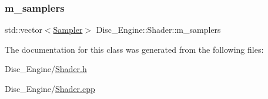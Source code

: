 \mbox{\label{class_disc___engine_1_1_shader_a63a34fc1f35b70acfcf2d8113d2bf29c}} 
\subsubsection{\texorpdfstring{m\+\_\+samplers}{m\_samplers}}
{\footnotesize\ttfamily std\+::vector$<$\mbox{\hyperlink{struct_disc___engine_1_1_sampler}{Sampler}}$>$ Disc\+\_\+\+Engine\+::\+Shader\+::m\+\_\+samplers\hspace{0.3cm}{\ttfamily [private]}}



The documentation for this class was generated from the following files\+:\begin{DoxyCompactItemize}
\item 
Disc\+\_\+\+Engine/\mbox{\hyperlink{_shader_8h}{Shader.\+h}}\item 
Disc\+\_\+\+Engine/\mbox{\hyperlink{_shader_8cpp}{Shader.\+cpp}}\end{DoxyCompactItemize}
